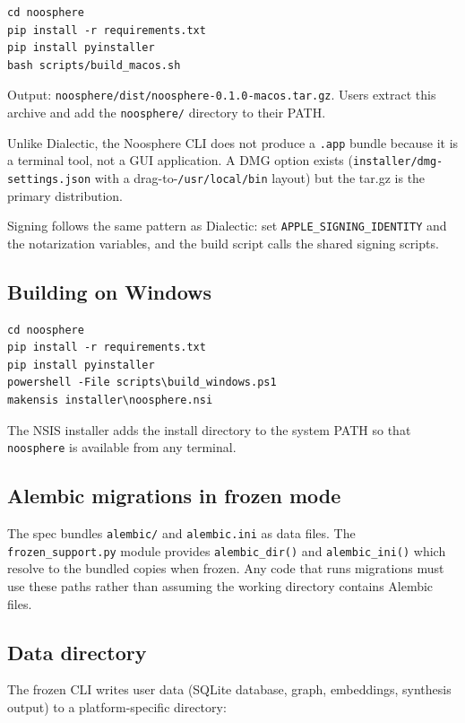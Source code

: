 \documentclass[11pt,letterpaper]{article}
\newcommand{\file}[1]{\texttt{#1}}
\newcommand{\cmd}[1]{\texttt{#1}}
\begin{document}
\begin{lstlisting}
cd noosphere
pip install -r requirements.txt
pip install pyinstaller
bash scripts/build_macos.sh
\end{lstlisting}

Output: \file{noosphere/dist/noosphere-0.1.0-macos.tar.gz}. Users extract this archive and add the \file{noosphere/} directory to their PATH.

Unlike Dialectic, the Noosphere CLI does not produce a \file{.app} bundle because it is a terminal tool, not a GUI application. A DMG option exists (\file{installer/dmg-settings.json} with a drag-to-\file{/usr/local/bin} layout) but the tar.gz is the primary distribution.

Signing follows the same pattern as Dialectic: set \cmd{APPLE\_SIGNING\_IDENTITY} and the notarization variables, and the build script calls the shared signing scripts.

\subsection{Building on Windows}

\begin{lstlisting}
cd noosphere
pip install -r requirements.txt
pip install pyinstaller
powershell -File scripts\build_windows.ps1
makensis installer\noosphere.nsi
\end{lstlisting}

The NSIS installer adds the install directory to the system PATH so that \cmd{noosphere} is available from any terminal.

\subsection{Alembic migrations in frozen mode}

The spec bundles \file{alembic/} and \file{alembic.ini} as data files. The \file{frozen\_support.py} module provides \cmd{alembic\_dir()} and \cmd{alembic\_ini()} which resolve to the bundled copies when frozen. Any code that runs migrations must use these paths rather than assuming the working directory contains Alembic files.

\subsection{Data directory}

The frozen CLI writes user data (SQLite database, graph, embeddings, synthesis output) to a platform-specific directory:
\end{document}
